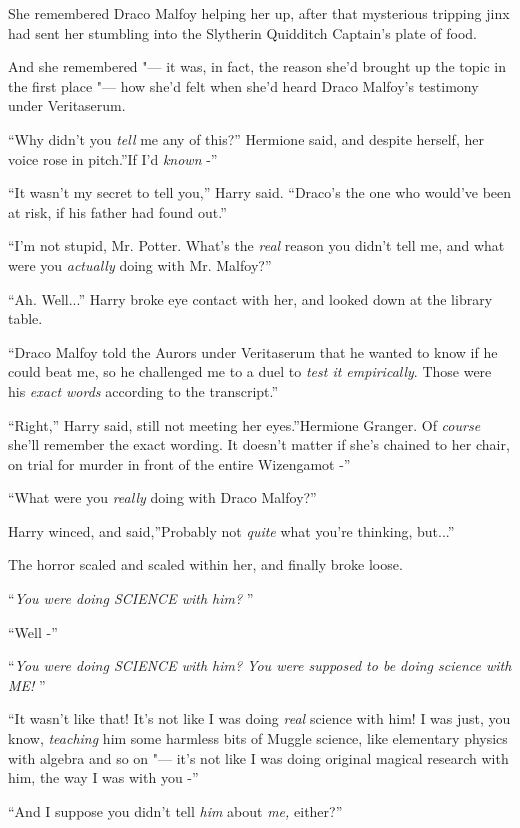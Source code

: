 She remembered Draco Malfoy helping her up, after that mysterious
tripping jinx had sent her stumbling into the Slytherin Quidditch
Captain's plate of food.

And she remembered "--- it was, in fact, the reason she'd brought up the
topic in the first place "--- how she'd felt when she'd heard Draco
Malfoy's testimony under Veritaserum.

``Why didn't you \emph{tell} me any of this?'' Hermione said, and despite
herself, her voice rose in pitch.''If I'd \emph{known} -''

``It wasn't my secret to tell you,'' Harry said. ``Draco's the one who
would've been at risk, if his father had found out.''

``I'm not stupid, Mr. Potter. What's the \emph{real} reason you didn't
tell me, and what were you \emph{actually} doing with Mr. Malfoy?''

``Ah. Well...'' Harry broke eye contact with her, and looked down
at the library table.

``Draco Malfoy told the Aurors under Veritaserum that he wanted to know
if he could beat me, so he challenged me to a duel to \emph{test it
empirically}. Those were his \emph{exact words} according to the
transcript.''

``Right,'' Harry said, still not meeting her eyes.''Hermione Granger. Of
\emph{course} she'll remember the exact wording. It doesn't matter if
she's chained to her chair, on trial for murder in front of the entire
Wizengamot -''

``What were you \emph{really} doing with Draco Malfoy?''

Harry winced, and said,''Probably not \emph{quite} what you're thinking,
but...''

The horror scaled and scaled within her, and finally broke loose.

``\emph{You were doing SCIENCE with him?} ''

``Well -''

``\emph{You were doing SCIENCE with him? You were supposed to be doing
science with ME!} ''

``It wasn't like that! It's not like I was doing \emph{real} science with
him! I was just, you know, \emph{teaching} him some harmless bits of
Muggle science, like elementary physics with algebra and so on "--- it's
not like I was doing original magical research with him, the way I was
with you -''

``And I suppose you didn't tell \emph{him} about \emph{me,} either?''

